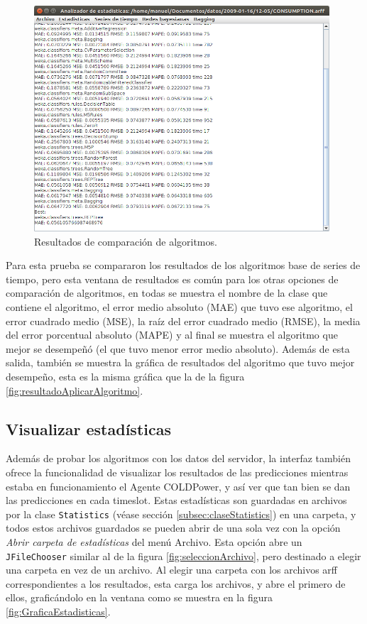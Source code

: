 \begin{figure}[h]
	\centering
	\includegraphics[width=11cm]{img/resultadosCompararAlgoritmo.png}
	\caption{Resultados de comparación de algoritmos.}
	\label{fig:resultadosCompararAlgoritmo}
\end{figure}

Para esta prueba se compararon los resultados de los algoritmos base de series de tiempo, pero esta ventana de resultados es común para los otras opciones de comparación de algoritmos, en todas se muestra el nombre de la clase que contiene el algoritmo, el error medio absoluto (MAE) que tuvo ese algoritmo, el error cuadrado medio (MSE), la raíz del error cuadrado medio (RMSE),  %
 la media del error porcentual absoluto (MAPE) y al final se muestra el algoritmo que mejor se desempeñó (el que tuvo menor error medio absoluto). 
Además de esta salida, también se muestra la gráfica de resultados del algoritmo que tuvo mejor desempeño, esta es la misma gráfica que la de la figura \ref{fig:resultadoAplicarAlgoritmo}.

\subsection{Visualizar estadísticas}
Además de probar los algoritmos con los datos del servidor, la interfaz también ofrece la funcionalidad de visualizar los resultados de las predicciones mientras estaba en funcionamiento el Agente COLDPower, y así ver que tan bien se dan las predicciones en cada timeslot. 
Estas estadísticas son guardadas en archivos por la clase \texttt{Statistics} (véase sección \ref{subsec:claseStatistics}) en una carpeta, y todos estos archivos guardados se pueden abrir de una sola vez con la opción \textit{Abrir carpeta de estadísticas} del menú Archivo. Esta opción abre un \texttt{JFileChooser} similar al de la figura \ref{fig:seleccionArchivo}, pero destinado a elegir una carpeta en vez de un archivo.
Al elegir una carpeta con los archivos arff correspondientes a los resultados, esta carga los archivos, y abre el primero de ellos, graficándolo en la ventana como se muestra en la figura \ref{fig:GraficaEstadisticas}.

